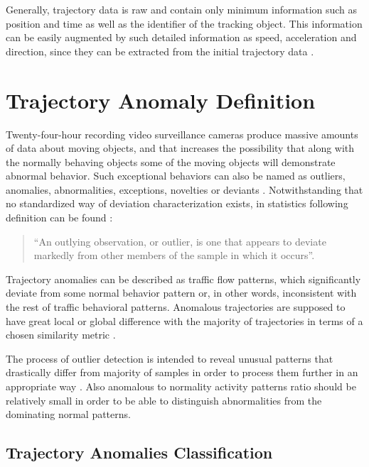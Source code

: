 Generally, trajectory data is raw and contain only minimum information such as position and time as well as the identifier of the tracking object. This information can be easily augmented by such detailed information as speed, acceleration and direction, since they can be extracted from the initial trajectory data \cite{article:12_dssto_mot}.

\section{Trajectory Anomaly Definition}

Twenty-four-hour recording video surveillance cameras produce massive amounts of data about moving objects, and that increases the possibility that along with the normally behaving objects some of the moving objects will demonstrate abnormal behavior. Such exceptional behaviors can also be named as outliers, anomalies, abnormalities, exceptions, novelties or deviants \cite{article:11_eod_hdd}\cite{article:15_survey_ad}. Notwithstanding that no standardized way of deviation characterization exists, in statistics following definition can be found \cite{article:13_pdoos}:
\begin{quote}
	``An outlying observation, or outlier, is one that appears to deviate markedly from other members of the sample in which it occurs''.
\end{quote}

Trajectory anomalies can be described as traffic flow patterns, which significantly deviate from some normal behavior pattern or, in other words, inconsistent with the rest of traffic behavioral patterns. Anomalous trajectories are supposed to have great local or global difference with the majority of trajectories in terms of a chosen similarity metric \cite{article:over_tod}.
 
The process of outlier detection is intended to reveal unusual patterns that drastically differ from majority of samples in order to process them further in an appropriate way \cite{article:11_eod_hdd}. Also anomalous to normality activity patterns ratio should be relatively small in order to be able to distinguish abnormalities from the dominating normal patterns.

\subsection{Trajectory Anomalies Classification}

